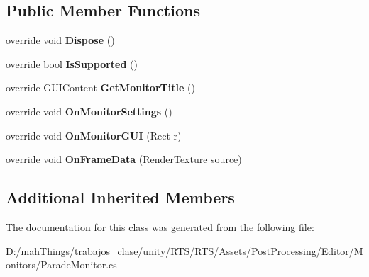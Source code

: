 \subsection*{Public Member Functions}
\begin{DoxyCompactItemize}
\item 
\mbox{\label{class_unity_editor_1_1_post_processing_1_1_parade_monitor_a44b7cab29094f27567876326ed95532b}} 
override void {\bfseries Dispose} ()
\item 
\mbox{\label{class_unity_editor_1_1_post_processing_1_1_parade_monitor_a2dd290573b4cffc742c71023f6cf8e96}} 
override bool {\bfseries Is\+Supported} ()
\item 
\mbox{\label{class_unity_editor_1_1_post_processing_1_1_parade_monitor_a6cc2ec9d06d49a5449f5bff20e43d27d}} 
override G\+U\+I\+Content {\bfseries Get\+Monitor\+Title} ()
\item 
\mbox{\label{class_unity_editor_1_1_post_processing_1_1_parade_monitor_acd49021b355e14e3fe60feefe350a504}} 
override void {\bfseries On\+Monitor\+Settings} ()
\item 
\mbox{\label{class_unity_editor_1_1_post_processing_1_1_parade_monitor_add0c2d3325871b1df9e4e49302f0a426}} 
override void {\bfseries On\+Monitor\+G\+UI} (Rect r)
\item 
\mbox{\label{class_unity_editor_1_1_post_processing_1_1_parade_monitor_a8e49f6f541ec218ac719b87773deaae6}} 
override void {\bfseries On\+Frame\+Data} (Render\+Texture source)
\end{DoxyCompactItemize}
\subsection*{Additional Inherited Members}


The documentation for this class was generated from the following file\+:\begin{DoxyCompactItemize}
\item 
D\+:/mah\+Things/trabajos\+\_\+clase/unity/\+R\+T\+S/\+R\+T\+S/\+Assets/\+Post\+Processing/\+Editor/\+Monitors/Parade\+Monitor.\+cs\end{DoxyCompactItemize}
